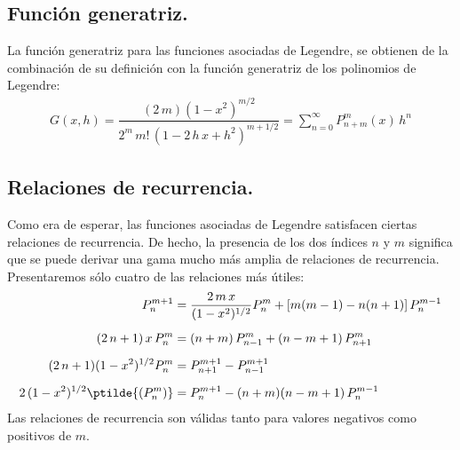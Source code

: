 \subsection{Función generatriz.}
La función generatriz para las funciones asociadas de Legendre, se obtienen de la combinación de su definición con la función generatriz de los polinomios de Legendre:
\begin{align}
G(x, h) = \dfrac{(2 \, m)(1 - x^{2})^{m/2}}{2^{m} \, m! \, (1 - 2 \, h \, x + h^{2})^{m+1/2}} = \sum_{n=0}^{\infty} P_{n+m}^{m} (x) \, h^{n}
\label{eq:ecuacion_18_40}
\end{align}
\subsection{Relaciones de recurrencia.}
Como era de esperar, las funciones asociadas de Legendre satisfacen ciertas relaciones de recurrencia. De hecho, la presencia de los dos índices $n$ y $m$ significa que se puede derivar una gama mucho más amplia de relaciones de recurrencia. Presentaremos sólo cuatro de las relaciones más útiles:
\begin{align*}
P_{n}^{m+1} &= \dfrac{2 \, m \, x}{(1 - x^{2})^{1/2}} P_{n}^{m} + [m (m - 1) - n (n + 1)] \, P_{n}^{m-1} \\[0.5em]
(2 \, n + 1) \, x \, P_{n}^{m} &= (n + m) \, P_{n-1}^{m} + (n - m + 1) \, P_{n+1}^{m} \\[0.5em]
(2 \, n + 1)(1 -  x^{2})^{1/2} P_{n}^{m} &= P_{n+1}^{m+1} - P_{n-1}^{m+1} \\[0.5em]
2 \, (1 - x^{2})^{1/2} \ptilde{(P_{n}^{m})} &= P_{n}^{m+1} - (n + m)(n - m + 1) \, P_{n}^{m-1}
\end{align*}
Las relaciones de recurrencia son válidas tanto para valores negativos como positivos de $m$.
